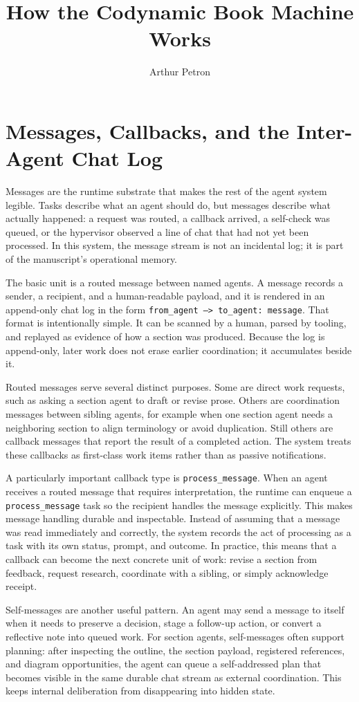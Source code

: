 \documentclass[11pt]{article}
\title{How the Codynamic Book Machine Works}
\author{Arthur Petron}
\begin{document}
\section*{Messages, Callbacks, and the Inter-Agent Chat Log}

Messages are the runtime substrate that makes the rest of the agent system legible. Tasks describe what an agent should do, but messages describe what actually happened: a request was routed, a callback arrived, a self-check was queued, or the hypervisor observed a line of chat that had not yet been processed. In this system, the message stream is not an incidental log; it is part of the manuscript's operational memory.

The basic unit is a routed message between named agents. A message records a sender, a recipient, and a human-readable payload, and it is rendered in an append-only chat log in the form \texttt{from\_agent --\textgreater{} to\_agent: message}. That format is intentionally simple. It can be scanned by a human, parsed by tooling, and replayed as evidence of how a section was produced. Because the log is append-only, later work does not erase earlier coordination; it accumulates beside it.

Routed messages serve several distinct purposes. Some are direct work requests, such as asking a section agent to draft or revise prose. Others are coordination messages between sibling agents, for example when one section agent needs a neighboring section to align terminology or avoid duplication. Still others are callback messages that report the result of a completed action. The system treats these callbacks as first-class work items rather than as passive notifications.

A particularly important callback type is \texttt{process\_message}. When an agent receives a routed message that requires interpretation, the runtime can enqueue a \texttt{process\_message} task so the recipient handles the message explicitly. This makes message handling durable and inspectable. Instead of assuming that a message was read immediately and correctly, the system records the act of processing as a task with its own status, prompt, and outcome. In practice, this means that a callback can become the next concrete unit of work: revise a section from feedback, request research, coordinate with a sibling, or simply acknowledge receipt.

Self-messages are another useful pattern. An agent may send a message to itself when it needs to preserve a decision, stage a follow-up action, or convert a reflective note into queued work. For section agents, self-messages often support planning: after inspecting the outline, the section payload, registered references, and diagram opportunities, the agent can queue a self-addressed plan that becomes visible in the same durable chat stream as external coordination. This keeps internal deliberation from disappearing into hidden state.
\end{document}
